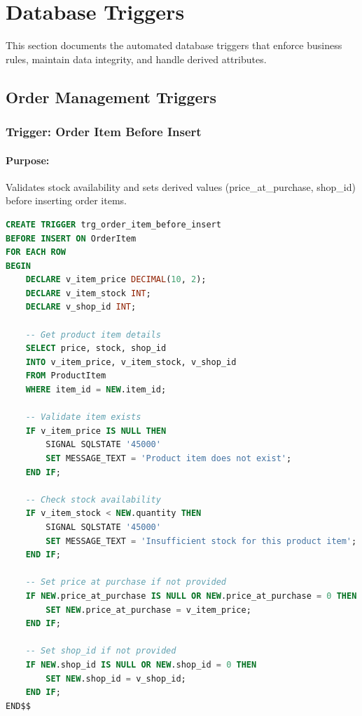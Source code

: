 \section{Database Triggers}

This section documents the automated database triggers that enforce business rules, maintain data integrity, and handle derived attributes.

\subsection{Order Management Triggers}

\subsubsection{Trigger: Order Item Before Insert}

\paragraph{Purpose:} Validates stock availability and sets derived values (price\_at\_purchase, shop\_id) before inserting order items.

\begin{lstlisting}[language=SQL, caption=Trigger: trg\_order\_item\_before\_insert, label=lst:trg_order_item_before]
CREATE TRIGGER trg_order_item_before_insert
BEFORE INSERT ON OrderItem
FOR EACH ROW
BEGIN
    DECLARE v_item_price DECIMAL(10, 2);
    DECLARE v_item_stock INT;
    DECLARE v_shop_id INT;
    
    -- Get product item details
    SELECT price, stock, shop_id
    INTO v_item_price, v_item_stock, v_shop_id
    FROM ProductItem
    WHERE item_id = NEW.item_id;
    
    -- Validate item exists
    IF v_item_price IS NULL THEN
        SIGNAL SQLSTATE '45000' 
        SET MESSAGE_TEXT = 'Product item does not exist';
    END IF;
    
    -- Check stock availability
    IF v_item_stock < NEW.quantity THEN
        SIGNAL SQLSTATE '45000' 
        SET MESSAGE_TEXT = 'Insufficient stock for this product item';
    END IF;
    
    -- Set price at purchase if not provided
    IF NEW.price_at_purchase IS NULL OR NEW.price_at_purchase = 0 THEN
        SET NEW.price_at_purchase = v_item_price;
    END IF;
    
    -- Set shop_id if not provided
    IF NEW.shop_id IS NULL OR NEW.shop_id = 0 THEN
        SET NEW.shop_id = v_shop_id;
    END IF;
END$$
\end{lstlisting}

